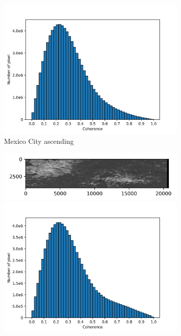 \documentclass[preprint, authoryear]{elsarticle}
\begin{document}
\begin{figure}
\begin{subfigure}{0.5\textwidth}
\begin{minipage}{0.5\textwidth}
        \end{minipage}%
        \begin{minipage}{0.5\textwidth}
            \centering
            \includegraphics[width=\textwidth]{figure/The coherence/coh_Mexico_asc_esd1_histogram_.png}
        \end{minipage}
        \caption{Mexico City ascending}
        \label{fig_6c}
    \end{subfigure}%
    \begin{subfigure}{0.5\textwidth}
        \centering
        \begin{minipage}{0.5\textwidth}
            \centering
            \includegraphics[width=\textwidth]{figure/The coherence/coh_Mexico_des_esd1.png}
        \end{minipage}%
        \begin{minipage}{0.5\textwidth}
            \centering
            \includegraphics[width=\textwidth]{figure/The coherence/coh_Mexico_des_esd1_histogram_.png}

\end{minipage}
\end{subfigure}
\end{figure}
\end{document}
